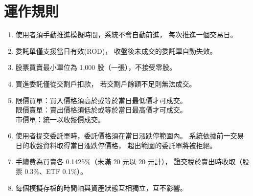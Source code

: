 \documentclass[UTF8, a4paper, 12pt, fontset=none]{ctexart}
\begin{document}
    \section{運作規則}
    \begin{enumerate}
        \item 使用者須手動推進模擬時間，系統不會自動前進，
        每次推進一個交易日。

        \item 委託單僅支援當日有效(ROD)，
        收盤後未成交的委託單自動失效。

        \item 股票買賣最小單位為 1,000 股（一張），不接受零股。

        \item 買進委託僅從交割戶扣款，
        若交割戶餘額不足則無法成交。

        \item 限價買單：買入價格須高於或等於當日最低價才可成交。\\
            限價賣單：賣出價格須低於或等於當日最高價才可成交。\\
            市價單：統一以收盤價成交。
        
        \item 使用者提交委託單時，委託價格須在當日漲跌停範圍內。
        系統依據前一交易日的收盤資料取得當日漲跌停價格，
        超出範圍的委託單將被拒絕。
        
        \item 手續費為買賣各 0.1425\%（未滿 20 元以 20 元計），
        證交稅於賣出時收取（股票 0.3\%、ETF 0.1\%）。


        \item 每個模擬存檔的時間軸與資產狀態互相獨立，互不影響。
    \end{enumerate}
\end{document}
